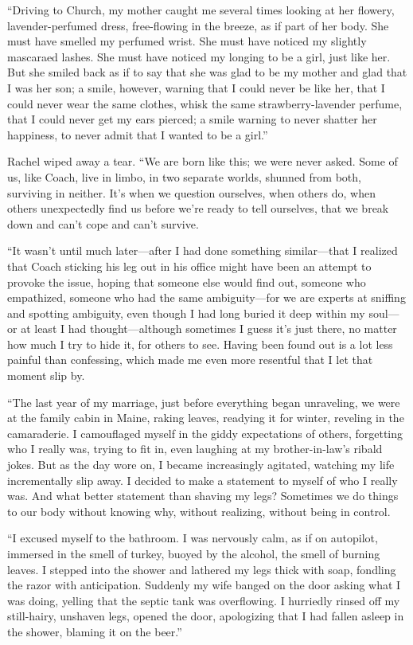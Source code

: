 ``Driving to Church, my mother caught me several times looking at her
flowery, lavender-perfumed dress, free-flowing in the breeze, as if part
of her body. She must have smelled my perfumed wrist. She must have
noticed my slightly mascaraed lashes. She must have noticed my longing
to be a girl, just like her. But she smiled back as if to say that she
was glad to be my mother and glad that I was her son; a smile, however,
warning that I could never be like her, that I could never wear the same
clothes, whisk the same strawberry-lavender perfume, that I could never
get my ears pierced; a smile warning to never shatter her happiness, to
never admit that I wanted to be a girl.''

Rachel wiped away a tear. ``We are born like this; we were never asked.
Some of us, like Coach, live in limbo, in two separate worlds, shunned
from both, surviving in neither. It's when we question ourselves, when
others do, when others unexpectedly find us before we're ready to tell
ourselves, that we break down and can't cope and can't survive.

``It wasn't until much later---after I had done something similar---that
I realized that Coach sticking his leg out in his office might have been
an attempt to provoke the issue, hoping that someone else would find
out, someone who empathized, someone who had the same ambiguity---for we
are experts at sniffing and spotting ambiguity, even though I had long
buried it deep within my soul---or at least I had thought---although
sometimes I guess it's just there, no matter how much I try to hide it,
for others to see. Having been found out is a lot less painful than
confessing, which made me even more resentful that I let that moment
slip by.

``The last year of my marriage, just before everything began unraveling,
we were at the family cabin in Maine, raking leaves, readying it for
winter, reveling in the camaraderie. I camouflaged myself in the giddy
expectations of others, forgetting who I really was, trying to fit in,
even laughing at my brother-in-law's ribald jokes. But as the day wore
on, I became increasingly agitated, watching my life incrementally slip
away. I decided to make a statement to myself of who I really was. And
what better statement than shaving my legs? Sometimes we do things to
our body without knowing why, without realizing, without being in
control.

``I excused myself to the bathroom. I was nervously calm, as if on
autopilot, immersed in the smell of turkey, buoyed by the alcohol, the
smell of burning leaves. I stepped into the shower and lathered my legs
thick with soap, fondling the razor with anticipation. Suddenly my wife
banged on the door asking what I was doing, yelling that the septic tank
was overflowing. I hurriedly rinsed off my still-hairy, unshaven legs,
opened the door, apologizing that I had fallen asleep in the shower,
blaming it on the beer.''

